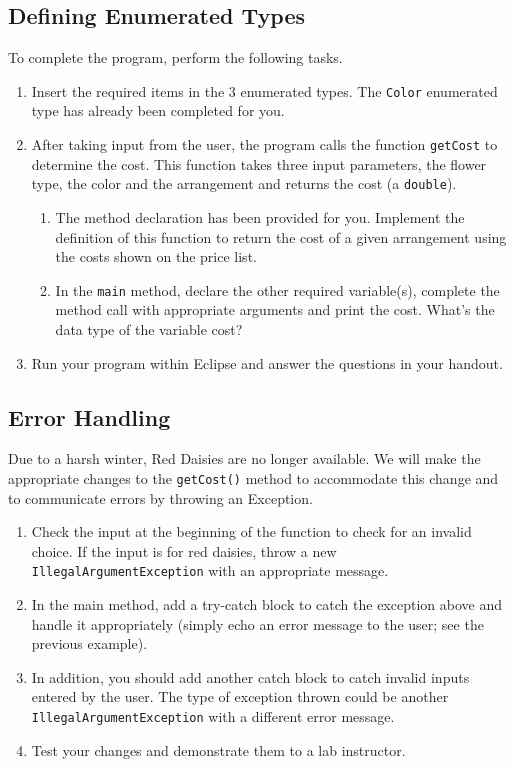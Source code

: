 \documentclass[12pt]{scrartcl}
\begin{document}
\subsection{Defining Enumerated Types}

To complete the program, perform the following tasks.
\begin{enumerate}
  \item Insert the required items in the 3 enumerated types.  The \texttt{Color} 
  	enumerated type has already been completed for you.  
  \item After taking input from the user, the program calls the function 
	\texttt{getCost} to determine the cost. This function takes three 
	input parameters, the flower type, the color and the arrangement and 
	returns the cost (a \texttt{double}).
	\begin{enumerate}
	  \item The method declaration has been provided for you. Implement the 
	  definition of this function to return the cost of a given arrangement using 
	  the costs shown on the price list.
	  \item In the \texttt{main} method, declare the other required variable(s), complete 
	  the method call with appropriate arguments and print the cost. What's the 
	  data type of the variable cost?
	\end{enumerate}
  \item Run your program within Eclipse and answer the questions in your handout.
\end{enumerate}

\subsection{Error Handling}

Due to a harsh winter, Red Daisies are no longer available.  We will make 
the appropriate changes to the \texttt{getCost()} method to accommodate 
this change and to communicate errors by throwing an Exception.
\begin{enumerate}
  \item Check the input at the beginning of the function to check for an invalid choice.  
  	If the input is for red daisies, throw a new \texttt{IllegalArgumentException} 
	with an appropriate message.
  \item In the main method, add a try-catch block to catch the exception above and handle 
	it appropriately (simply echo an error message to the user; see the previous example).
  \item In addition, you should add another catch block to catch invalid inputs entered by 
	the user.  The type of exception thrown could be another \texttt{IllegalArgumentException} 
	with a different error message.
  \item Test your changes and demonstrate them to a lab instructor.
\end{enumerate}
\end{document}
